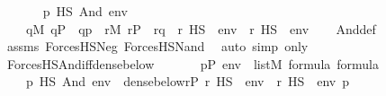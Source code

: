 \begin{isabellebody}
\ \ \isanewline
\ \ \ \ {\isachardoublequoteopen}p\ {\isasymtturnstile}HS\ And{\isacharparenleft}{\kern0pt}{\isasymphi}{\isacharcomma}{\kern0pt}{\isasympsi}{\isacharparenright}{\kern0pt}\ env\ \ \ {\isasymlongleftrightarrow}\ \isanewline
\ \ \ \ {\isacharparenleft}{\kern0pt}{\isasymforall}q{\isasymin}M{\isachardot}{\kern0pt}\ q{\isasymin}P\ {\isasymand}\ q{\isasympreceq}p\ {\isasymlongrightarrow}\ {\isacharparenleft}{\kern0pt}{\isasymexists}r{\isasymin}M{\isachardot}{\kern0pt}\ r{\isasymin}P\ {\isasymand}\ r{\isasympreceq}q\ {\isasymand}\ {\isacharparenleft}{\kern0pt}r\ {\isasymtturnstile}HS\ {\isasymphi}\ env{\isacharparenright}{\kern0pt}\ {\isasymand}\ {\isacharparenleft}{\kern0pt}r\ {\isasymtturnstile}HS\ {\isasympsi}\ env{\isacharparenright}{\kern0pt}{\isacharparenright}{\kern0pt}{\isacharparenright}{\kern0pt}{\isachardoublequoteclose}\isanewline
%
\isadelimproof
\ \ %
\endisadelimproof
%
\isatagproof
{}\isamarkupfalse%
\ And{\isacharunderscore}{\kern0pt}def\ \isamarkupfalse%
\ assms\ ForcesHS{\isacharunderscore}{\kern0pt}Neg\ ForcesHS{\isacharunderscore}{\kern0pt}Nand\ \isamarkupfalse%
\ {\isacharparenleft}{\kern0pt}auto\ simp\ only{\isacharcolon}{\kern0pt}{\isacharparenright}{\kern0pt}%
\endisatagproof
{\isafoldproof}%
%
\isadelimproof
\isanewline
%
\endisadelimproof
\isanewline
{}\isamarkupfalse%
\ ForcesHS{\isacharunderscore}{\kern0pt}And{\isacharunderscore}{\kern0pt}iff{\isacharunderscore}{\kern0pt}dense{\isacharunderscore}{\kern0pt}below{\isacharcolon}{\kern0pt}\isanewline
\ \ \isanewline
\ \ \ \ {\isachardoublequoteopen}p{\isasymin}P{\isachardoublequoteclose}\ {\isachardoublequoteopen}env\ {\isasymin}\ list{\isacharparenleft}{\kern0pt}M{\isacharparenright}{\kern0pt}{\isachardoublequoteclose}\ {\isachardoublequoteopen}{\isasymphi}{\isasymin}formula{\isachardoublequoteclose}\ {\isachardoublequoteopen}{\isasympsi}{\isasymin}formula{\isachardoublequoteclose}\isanewline
\ \ \isanewline
\ \ \ \ {\isachardoublequoteopen}{\isacharparenleft}{\kern0pt}p\ {\isasymtturnstile}HS\ And{\isacharparenleft}{\kern0pt}{\isasymphi}{\isacharcomma}{\kern0pt}{\isasympsi}{\isacharparenright}{\kern0pt}\ env{\isacharparenright}{\kern0pt}\ {\isasymlongleftrightarrow}\ dense{\isacharunderscore}{\kern0pt}below{\isacharparenleft}{\kern0pt}{\isacharbraceleft}{\kern0pt}r{\isasymin}P{\isachardot}{\kern0pt}\ {\isacharparenleft}{\kern0pt}r\ {\isasymtturnstile}HS\ {\isasymphi}\ env{\isacharparenright}{\kern0pt}\ {\isasymand}\ {\isacharparenleft}{\kern0pt}r\ {\isasymtturnstile}HS\ {\isasympsi}\ env{\isacharparenright}{\kern0pt}\ {\isacharbraceright}{\kern0pt}{\isacharcomma}{\kern0pt}p{\isacharparenright}{\kern0pt}{\isachardoublequoteclose}\isanewline

\end{isabellebody}
